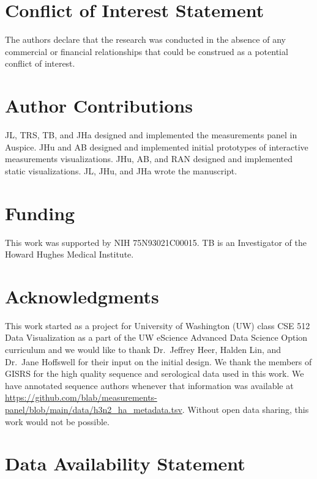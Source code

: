 \documentclass[utf8]{FrontiersinHarvard} %
\begin{document}
\section*{Conflict of Interest Statement}

The authors declare that the research was conducted in the absence of any commercial or financial relationships that could be construed as a potential conflict of interest.

\section*{Author Contributions}

JL, TRS, TB, and JHa designed and implemented the measurements panel in Auspice.
JHu and AB designed and implemented initial prototypes of interactive measurements visualizations.
JHu, AB, and RAN designed and implemented static visualizations.
JL, JHu, and JHa wrote the manuscript.

\section*{Funding}

This work was supported by NIH 75N93021C00015.
TB is an Investigator of the Howard Hughes Medical Institute.

\section*{Acknowledgments}

This work started as a project for University of Washington (UW) class CSE 512 Data Visualization as a part of the UW eScience Advanced Data Science Option curriculum and we would like to thank Dr.\ Jeffrey Heer, Halden Lin, and Dr.\ Jane Hoffswell for their input on the initial design.
We thank the members of GISRS for the high quality sequence and serological data used in this work.
We have annotated sequence authors whenever that information was available at \url{https://github.com/blab/measurements-panel/blob/main/data/h3n2_ha_metadata.tsv}.
Without open data sharing, this work would not be possible.

\section*{Data Availability Statement}
\end{document}

